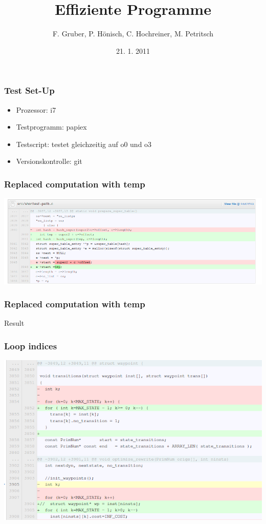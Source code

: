 \documentclass{beamer}
\title{Effiziente Programme}
\author{F. Gruber, P. H\"onisch, C. Hochreiner, M. Petritsch}
\date{21. 1. 2011}
\begin{document}
\frame{\titlepage}

\begin{frame}\frametitle{Test Set-Up}
\begin{itemize}
  \item Prozessor: i7
  \item Testprogramm: papiex
  \item Testscript: testet gleichzeitig auf o0 und o3
  \item Versionskontrolle: git
\end{itemize}
\end{frame}

\begin{frame}\frametitle{Replaced computation with temp}
\begin{center}
\includegraphics[scale=0.4]{shots/rcwt.png}
\end{center}
\end{frame}

\begin{frame}\frametitle{Replaced computation with temp}
\begin{center}
Result
\end{center}
\end{frame}

\begin{frame}\frametitle{Loop indices}
\begin{center}
\includegraphics[scale=0.4]{shots/loop_indices.png}
\end{center}
\end{frame}
\end{document}
